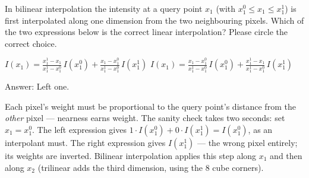 \documentclass[11pt]{exam}
\newcommand{\answerspace}[1]{\ifprintanswers\else\vspace{#1}\fi}
\begin{document}
\begin{questions}

\question
In bilinear interpolation the intensity at a query point $x_1$ (with $x_1^0 \le x_1 \le x_1^1$) is
first interpolated along one dimension from the two neighbouring pixels. Which of the two
expressions below is the correct linear interpolation? Please circle the correct choice.

\vspace{2mm}
\begin{center}
  $\displaystyle I(x_1) = \frac{x_1^1 - x_1}{x_1^1 - x_1^0}\, I(x_1^0)
  + \frac{x_1 - x_1^0}{x_1^1 - x_1^0}\, I(x_1^1)$
  \hspace{1.1cm}
  $\displaystyle I(x_1) = \frac{x_1 - x_1^0}{x_1^1 - x_1^0}\, I(x_1^0)
  + \frac{x_1^1 - x_1}{x_1^1 - x_1^0}\, I(x_1^1)$
\end{center}
\vspace{2mm}

\begin{solution}
  Answer: Left one.

  Each pixel's weight must be proportional to the query point's distance from the \emph{other}
  pixel --- nearness earns weight. The sanity check takes two seconds: set $x_1 = x_1^0$. The left
  expression gives $1 \cdot I(x_1^0) + 0 \cdot I(x_1^1) = I(x_1^0)$, as an interpolant must. The
  right expression gives $I(x_1^1)$ --- the wrong pixel entirely; its weights are inverted.
  Bilinear interpolation applies this step along $x_1$ and then along $x_2$ (trilinear adds the
  third dimension, using the 8 cube corners).
\end{solution}
\answerspace{1.5cm}


\end{questions}
\end{document}
